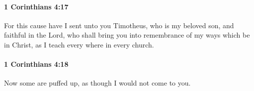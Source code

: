 		\paragraph{1 Corinthians 4:17} %
			\label{1CORINTHIANS-4-17}

			For this cause have I sent unto you Timotheus, who is my beloved son, and faithful in the Lord, who shall bring you into remembrance of my ways which be in Christ, as I teach every where in every church.

			\begin{framed}
			\scriptsize
				\begin{compactdesc}
					\item[SBLG] 
				\end{compactdesc}
			\end{framed}

		\paragraph{1 Corinthians 4:18} %
			\label{1CORINTHIANS-4-18}

			Now some are puffed up, as though I would not come to you.

